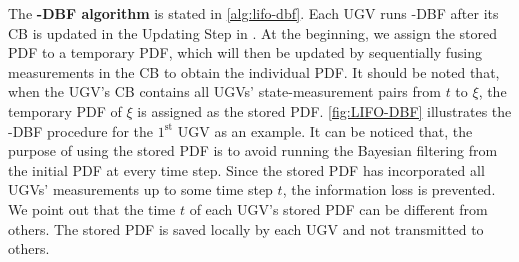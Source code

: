 	The \textbf{\proto-DBF algorithm} is stated in \cref{alg:lifo-dbf}.
	Each UGV runs \proto-DBF after its CB is updated in the Updating Step in .
	At the beginning, we assign the stored PDF to a temporary PDF, which will then be updated by sequentially fusing measurements in the CB to obtain the individual PDF.
	It should be noted that, when the UGV's CB contains all UGVs' state-measurement pairs from $t$ to $\xi$, the temporary PDF of $\xi$ is assigned as the stored PDF.
	\cref{fig:LIFO-DBF} illustrates the \proto-DBF procedure for the $1^\text{st}$ UGV as an example.
	It can be noticed that, the purpose of using the stored PDF is to avoid running the Bayesian filtering from the initial PDF at every time step. 
	Since the stored PDF has incorporated all UGVs' measurements up to some time step $t$, the information loss is prevented. %
	We point out that the time $t$ of each UGV's stored PDF can be different from others.
	The stored PDF is saved locally by each UGV and not transmitted to others.
	
